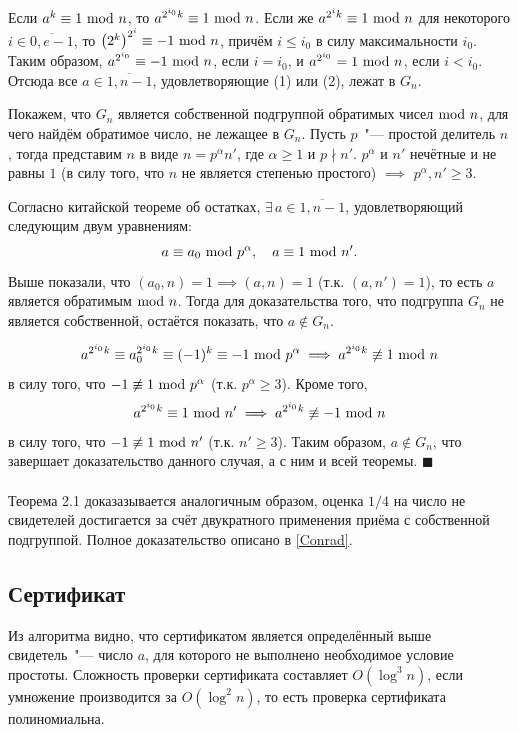 \documentclass[12pt]{article}
\theoremstyle{definition}
\numberwithin{Def}{section}
\numberwithin{Th}{section}
\numberwithin{St}{section}
\numberwithin{Cor}{section}
\newenvironment{Proof}                    
        {\par\noindent{\bf Доказательство.}}
        {\hfill$\scriptstyle\blacksquare$}
\begin{document}
\begin{Proof}
	Если $a^k\equiv 1\ \mathrm{mod}\ n$, то $a^{2^{i_0}k}\equiv 1\ \mathrm{mod}\ n$. Если же
	$a^{2^ik}\equiv 1\ \mathrm{mod}\ n$ для некоторого $i\in\overline{0,e-1}$, то
	$\left(2^k\right)^{2^i}\equiv-1\ \mathrm{mod}\ n$, причём $i\leqslant i_0$ в силу
	максимальности $i_0$. Таким образом, $a^{2^{i_0}}\equiv -1\ \mathrm{mod}\ n$, если
	$i=i_0$, и $a^{2^{i_0}}=1\ \mathrm{mod}\ n$, если $i<i_0$. Отсюда все
	$a\in\overline{1,n-1}$, удовлетворяющие (1) или (2), лежат в $G_n$.
	
	Покажем, что $G_n$ является собственной подгруппой обратимых чисел$\ \mathrm{mod}\ n$,
	для чего найдём обратимое число, не лежащее в $G_n$. Пусть $p$~"--- простой
	делитель $n$, тогда представим $n$ в виде $n=p^\alpha n'$, где
	$\alpha\geqslant 1$ и $p\nmid n'$. $p^\alpha$ и $n'$ нечётные и не равны $1$
	(в силу того, что $n$ не является степенью простого) $\implies$
	$p^\alpha,n'\geqslant 3$.
	
	Согласно китайской теореме об остатках, $\exists\,a\in\overline{1,n-1}$,
	удовлетворяющий следующим двум уравнениям:
	$$
	a\equiv a_0\ \mathrm{mod}\ p^\alpha, \quad a\equiv 1\ \mathrm{mod}\ n'. 
	$$
	Выше показали, что $(a_0,n)=1\implies (a,n)=1$ (т.к. $(a,n')=1$), то есть
	$a$ является обратимым$\ \mathrm{mod}\ n$. Тогда для доказательства того, что подгруппа
	$G_n$ не является собственной, остаётся показать, что $a\notin G_n$.
	
	$$
	a^{2^{i_0}k}\equiv a^{2^{i_0}k}_0 \equiv (-1)^k\equiv -1\ \mathrm{mod}\ p^\alpha
	\implies a^{2^{i_0}k}\not\equiv 1\ \mathrm{mod}\ n
	$$
	в силу того, что $-1\not\equiv 1\ \mathrm{mod}\ p^\alpha$ (т.к. $p^\alpha\geqslant 3$).
	Кроме того,
	$$
	a^{2^{i_0}k}\equiv 1\ \mathrm{mod}\ n'\implies a^{2^{i_0}k}\not\equiv -1\ \mathrm{mod}\ n
	$$
	в силу того, что $-1\not\equiv 1\ \mathrm{mod}\ n'$ (т.к. $n'\geqslant 3$). Таким
	образом, $a\notin G_n$, что завершает доказательство данного случая, а с ним
	и всей теоремы.
\end{Proof}
\\\\
Теорема 2.1 доказазывается аналогичным образом, оценка $1/4$ на число
не свидетелей достигается за счёт двукратного применения приёма с собственной
подгруппой. Полное доказательство описано в \ref{Conrad}.

\subsection{Сертификат}

Из алгоритма видно, что сертификатом является определённый выше свидетель~"---
число $a$, для которого не выполнено необходимое условие простоты. Сложность
проверки сертификата составляет $O(\log^3 n)$, если умножение производится
за $O(\log^2n)$, то есть проверка сертификата полиномиальна.
\end{document}
